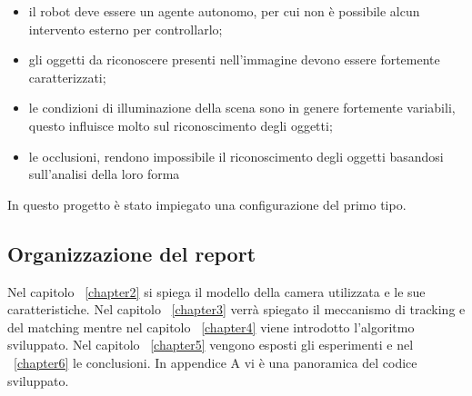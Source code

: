 \begin{itemize}
\item il robot deve essere un agente autonomo, per cui non è possibile alcun intervento esterno per controllarlo;
\item gli oggetti da riconoscere presenti nell’immagine devono essere fortemente caratterizzati;
\item le condizioni di illuminazione della scena sono in genere fortemente variabili, questo influisce molto sul riconoscimento degli oggetti;
\item le occlusioni, rendono impossibile il riconoscimento degli oggetti basandosi sull’analisi della loro forma
\end{itemize}
In questo progetto è stato impiegato una configurazione del primo tipo. 








\subsection{Organizzazione del report}
Nel capitolo ~\ref{chapter2} si spiega il modello della camera utilizzata e le sue caratteristiche.  Nel capitolo ~\ref{chapter3} verrà spiegato il meccanismo di tracking e del matching mentre nel capitolo ~\ref{chapter4} viene introdotto l'algoritmo sviluppato. Nel capitolo ~\ref{chapter5} vengono esposti gli esperimenti e nel ~\ref{chapter6} le conclusioni. In appendice A vi è una panoramica del codice sviluppato.